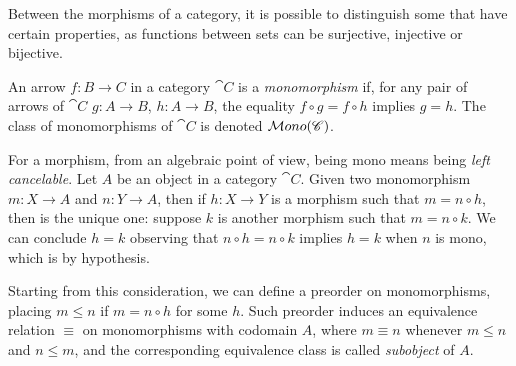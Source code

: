 Between the morphisms of a category, it is possible to distinguish some that have certain properties, as functions between sets can be surjective, injective or bijective.

\begin{definition}[Monomorphism]\label{def:mono}
    An arrow $f:B\rightarrow C$ in a category $\cat{C}$ is a \emph{monomorphism} if, for any pair of arrows of $\cat{C}$ $g:A \rightarrow B$, $h: A \rightarrow B$, the equality $f \circ g = f \circ h$ implies $g = h$. The class of monomorphisms of $\cat C$ is denoted $\mathcal{M}ono(\mathscr{C})$.
\end{definition}

\begin{remark}\label{rem:fact_of_subobject_is_unique}
    For a morphism, from an algebraic point of view, being mono means being \emph{left cancelable}.
    Let $A$ be an object in a category $\cat C$. Given two monomorphism $m: X \to A$ and $n: Y \to A$, then if  $h: X \to Y$ is a morphism such that $m = n \circ h$, then is the unique one: suppose $k$ is another morphism such that $m = n \circ k$. We can conclude $h = k$ observing that $n \circ h = n \circ k$ implies $h = k$ when $n$ is mono, which is by hypothesis.    
\end{remark}


\begin{definition}[Subobject]\label{def:subobj}
    Starting from this consideration, we can define a preorder on monomorphisms, placing $m \leq n$ if $m = n \circ h$ for some $h$. Such preorder induces an equivalence relation $\equiv$ on monomorphisms with codomain $A$, where $m \equiv n$ whenever $m \leq n$ and $n \leq m$, and the corresponding equivalence class is called \emph{subobject} of $A$.
\end{definition}



